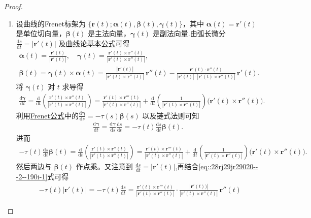 \documentclass[../../main.tex]{subfiles}%
\begin{document}
\begin{proof}
\begin{enumerate}
\item 设曲线的Frenet标架为 $\{\bm{r}(t); \bm{\alpha}(t), \bm{\beta}(t), \bm{\gamma}(t)\}$，其中 $\bm{\alpha}(t)=\bm{r}'(t)$ 是单位切向量，$\bm{\beta}(t)$ 是主法向量，$\bm{\gamma}(t)$ 是副法向量.由弧长微分 $\frac{\mathrm{d}s}{\mathrm{d}t}=|\bm{r}'(t)|$ 及\hyperref[theorem:曲线论基本公式]{曲线论基本公式}可得
\begin{gather}
\bm{\alpha}(t) = \frac{\bm{r}'(t)}{|\bm{r}'(t)|},  \quad 
\bm{\gamma}(t) = \frac{\bm{r}'(t) \times \bm{r}''(t)}{|\bm{r}'(t) \times \bm{r}''(t)|}, \nonumber \\
\bm{\beta}(t) =\bm{\gamma}(t)\times \bm{\alpha}(t)= \frac{|\bm{r}'(t)|}{|\bm{r}'(t) \times \bm{r}''(t)|}\,\bm{r}''(t) - \frac{\bm{r}'(t)\cdot\bm{r}''(t)}{|\bm{r}'(t)|\cdot|\bm{r}'(t) \times \bm{r}''(t)|}\,\bm{r}'(t). \label{eq::28rj29jr29020---2--190i-1}
\end{gather}
将 $\bm{\gamma}(t)$ 对 $t$ 求导得
\begin{align*}
\frac{\mathrm{d}\bm{\gamma}}{\mathrm{d}t} = \frac{\mathrm{d}}{\mathrm{d}t}\left( \frac{\bm{r}'(t) \times \bm{r}''(t)}{|\bm{r}'(t) \times \bm{r}''(t)|} \right)= \frac{\bm{r}'(t) \times \bm{r}'''(t)}{|\bm{r}'(t) \times \bm{r}''(t)|} + \frac{\mathrm{d}}{\mathrm{d}t}\left( \frac{1}{|\bm{r}'(t) \times \bm{r}''(t)|} \right) \bigl(\bm{r}'(t) \times \bm{r}''(t)\bigr).
\end{align*}
利用\hyperref[theorem:微分几何-Frenet公式]{Frenet公式}中的$\frac{\mathrm{d}\bm{\gamma}}{\mathrm{d}s} = -\tau(s)\bm{\beta}(s)$ 以及链式法则可知
\begin{align*}
\frac{\mathrm{d}\bm{\gamma}}{\mathrm{d}t} = \frac{\mathrm{d}\bm{\gamma}}{\mathrm{d}s}\frac{\mathrm{d}s}{\mathrm{d}t} = -\tau(t)\frac{\mathrm{d}s}{\mathrm{d}t}\bm{\beta}(t).
\end{align*}
进而
\begin{align*}
-\tau(t)\frac{\mathrm{d}s}{\mathrm{d}t}\bm{\beta}(t) = \frac{\mathrm{d}}{\mathrm{d}t}\left( \frac{\bm{r}'(t) \times \bm{r}''(t)}{|\bm{r}'(t) \times \bm{r}''(t)|} \right)= \frac{\bm{r}'(t) \times \bm{r}'''(t)}{|\bm{r}'(t) \times \bm{r}''(t)|} + \frac{\mathrm{d}}{\mathrm{d}t}\left( \frac{1}{|\bm{r}'(t) \times \bm{r}''(t)|} \right) \bigl(\bm{r}'(t) \times \bm{r}''(t)\bigr).
\end{align*}
然后两边与 $\bm{\beta}(t)$ 作点乘。又注意到 $\frac{\mathrm{d}s}{\mathrm{d}t}=|\bm{r}'(t)|$,再结合\eqref{eq::28rj29jr29020---2--190i-1}式可得
\begin{align*}
&-\tau \left( t \right) \left| \boldsymbol{r}' \left( t \right) \right|=-\tau \left( t \right) \frac{\mathrm{d}s}{\mathrm{d}t}=\frac{\boldsymbol{r}' \left( t \right) \times \boldsymbol{r}''' \left( t \right)}{\left| \boldsymbol{r}' \left( t \right) \times \boldsymbol{r}'' \left( t \right) \right|}\cdot \frac{|\boldsymbol{r}' \left( t \right) )|}{|\boldsymbol{r}' \left( t \right) \times \boldsymbol{r}'' \left( t \right) |}\,\boldsymbol{r}'' \left( t \right) \,

\end{align*}
\end{enumerate}
\end{proof}
\end{document}
